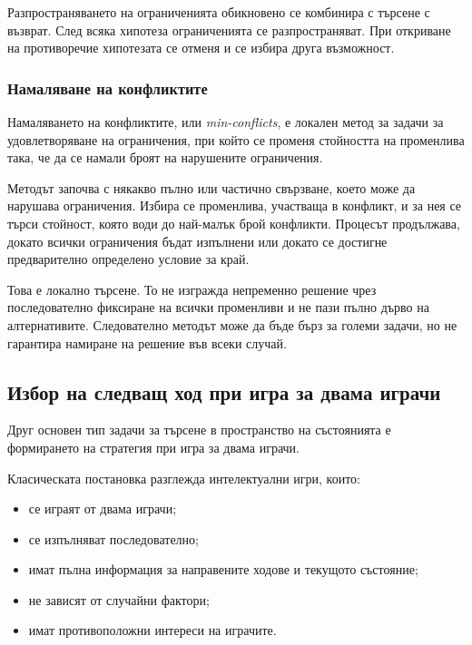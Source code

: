 Разпространяването на ограниченията обикновено се комбинира с търсене с възврат. След всяка хипотеза ограниченията се разпространяват. При откриване на противоречие хипотезата се отменя и се избира друга възможност.

\subsubsection{Намаляване на конфликтите}

\begin{defn}
Намаляването на конфликтите, или \emph{min-conflicts}, е локален метод за задачи за удовлетворяване на ограничения, при който се променя стойността на променлива така, че да се намали броят на нарушените ограничения.
\end{defn}

Методът започва с някакво пълно или частично свързване, което може да нарушава ограничения. Избира се променлива, участваща в конфликт, и за нея се търси стойност, която води до най-малък брой конфликти. Процесът продължава, докато всички ограничения бъдат изпълнени или докато се достигне предварително определено условие за край.

Това е локално търсене. То не изгражда непременно решение чрез последователно фиксиране на всички променливи и не пази пълно дърво на алтернативите. Следователно методът може да бъде бърз за големи задачи, но не гарантира намиране на решение във всеки случай.

\subsection{Избор на следващ ход при игра за двама играчи}\label{s:25.1.6}

Друг основен тип задачи за търсене в пространство на състоянията е формирането на стратегия при игра за двама играчи.

Класическата постановка разглежда интелектуални игри, които:

\begin{itemize}
\item се играят от двама играчи;
\item се изпълняват последователно;
\item имат пълна информация за направените ходове и текущото състояние;
\item не зависят от случайни фактори;
\item имат противоположни интереси на играчите.
\end{itemize}

